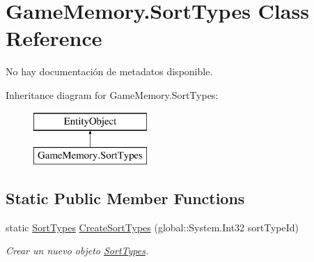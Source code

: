 \hypertarget{class_game_memory_1_1_sort_types}{\section{Game\-Memory.\-Sort\-Types Class Reference}
\label{class_game_memory_1_1_sort_types}
}


No hay documentación de metadatos disponible.  


Inheritance diagram for Game\-Memory.\-Sort\-Types\-:\begin{figure}[H]
\begin{center}
\leavevmode
\includegraphics[height=2.000000cm]{class_game_memory_1_1_sort_types}
\end{center}
\end{figure}
\subsection*{Static Public Member Functions}
\begin{DoxyCompactItemize}
\item 
static \hyperlink{class_game_memory_1_1_sort_types}{Sort\-Types} \hyperlink{class_game_memory_1_1_sort_types_ab951bab06c0cc7f65eff26dcef0585ff}{Create\-Sort\-Types} (global\-::\-System.\-Int32 sort\-Type\-Id)
\begin{DoxyCompactList}\small\item\em Crear un nuevo objeto \hyperlink{class_game_memory_1_1_sort_types}{Sort\-Types}. \end{DoxyCompactList}\end{DoxyCompactItemize}
